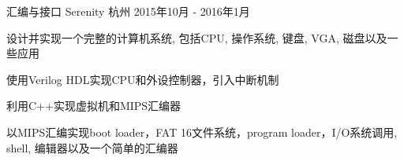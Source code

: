 \cventry
{汇编与接口} %
{Serenity} %
{杭州} %
{2015年10月 - 2016年1月} %
{ %
\begin{cvitems}
    \item {设计并实现一个完整的计算机系统, 包括CPU, 操作系统, 键盘, VGA, 磁盘以及一些应用}
    \item {使用Verilog HDL实现CPU和外设控制器，引入中断机制}
    \item {利用C++实现虚拟机和MIPS汇编器}
    \item {以MIPS汇编实现boot loader，FAT 16文件系统，program loader，I/O系统调用, shell, 编辑器以及一个简单的汇编器}    
\end{cvitems} 
}